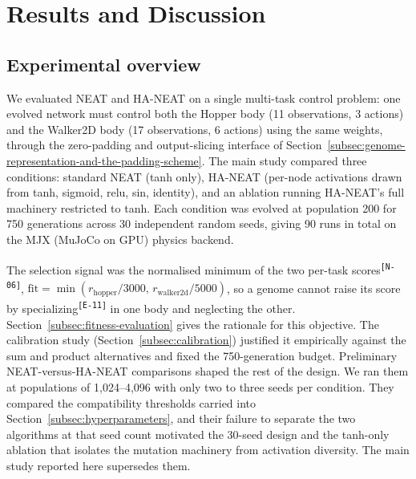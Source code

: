 \documentclass[12pt]{article}
\newcommand{\revID}[1]{\textsuperscript{\scriptsize\texttt{[#1]}}}
\newcommand{\revBrit}[2]{\textcolor{lrBlue}{#2}\revID{#1}}      %
\newcommand{\revNota}[2]{\textcolor{lrViolet}{#2}\revID{#1}}    %
\begin{document}

\newpage

\section{Results and Discussion}
\label{sec:results-and-discussion}

\subsection{Experimental overview}
\label{subsec:experimental-overview}
We evaluated NEAT and HA-NEAT on a single multi-task control problem: one evolved network must control both the Hopper body (11 observations, 3 actions) and the Walker2D body (17 observations, 6 actions) using the same weights, through the zero-padding and output-slicing interface of Section~\ref{subsec:genome-representation-and-the-padding-scheme}.
The main study compared three conditions: standard NEAT (tanh only), HA-NEAT (per-node activations drawn from tanh, sigmoid, relu, sin, identity), and an ablation running HA-NEAT's full machinery restricted to tanh.
Each condition was evolved at population 200 for 750 generations across 30 independent random seeds, giving 90 runs in total on the MJX (MuJoCo on GPU) physics backend.

The selection signal was the normalised minimum of the two per-task scores\revNota{N-06}{}, $\mathrm{fit} = \min(r_{\text{hopper}}/3000,\, r_{\text{walker2d}}/5000)$, so a genome cannot raise its score by \revBrit{E-11}{specializing} in one body and neglecting the other.
Section~\ref{subsec:fitness-evaluation} gives the rationale for this objective. The calibration study (Section~\ref{subsec:calibration}) justified it empirically against the sum and product alternatives and fixed the 750-generation budget.
Preliminary NEAT-versus-HA-NEAT comparisons shaped the rest of the design. We ran them at populations of 1{,}024--4{,}096 with only two to three seeds per condition. They compared the compatibility thresholds carried into Section~\ref{subsec:hyperparameters}, and their failure to separate the two algorithms at that seed count motivated the 30-seed design and the tanh-only ablation that isolates the mutation machinery from activation diversity. The main study reported here supersedes them.
\end{document}
